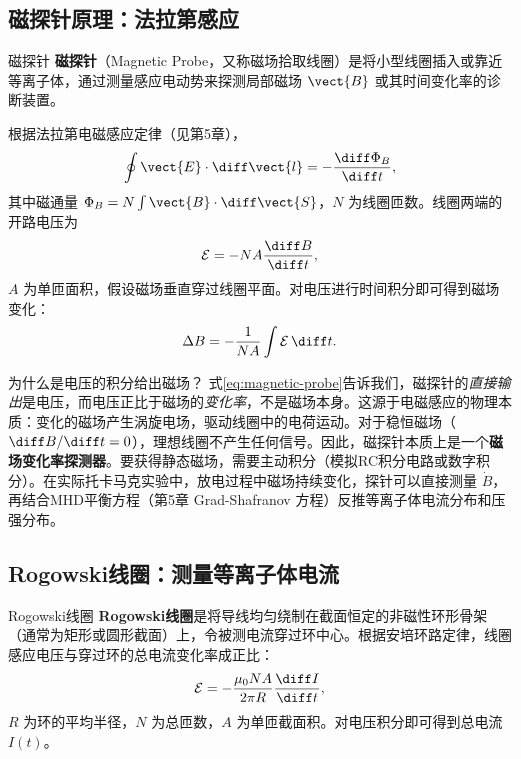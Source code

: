 \subsection{磁探针原理：法拉第感应}

\begin{definition}{磁探针}{}{}
\textbf{磁探针}（Magnetic Probe，又称磁场拾取线圈）是将小型线圈插入或靠近等离子体，通过测量感应电动势来探测局部磁场 $\vect{B}$ 或其时间变化率的诊断装置。
\end{definition}

根据法拉第电磁感应定律（见第5章），
\begin{equation}
\oint \vect{E}\cdot\diff\vect{l} = -\frac{\diff\Phi_B}{\diff t},
\label{eq:faraday}
\end{equation}
其中磁通量 $\Phi_B = N \int \vect{B}\cdot\diff\vect{S}$，$N$ 为线圈匝数。线圈两端的开路电压为
\begin{equation}
\mathcal{E} = -N A \frac{\diff B}{\diff t},
\label{eq:magnetic-probe}
\end{equation}
$A$ 为单匝面积，假设磁场垂直穿过线圈平面。对电压进行时间积分即可得到磁场变化：
\begin{equation}
\Delta B = -\frac{1}{NA}\int \mathcal{E}\,\diff t.
\label{eq:b-integration}
\end{equation}

\begin{insight}{为什么是电压的积分给出磁场？}{}{}
式\eqref{eq:magnetic-probe}告诉我们，磁探针的\emph{直接输出}是电压，而电压正比于磁场的\emph{变化率}，不是磁场本身。这源于电磁感应的物理本质：变化的磁场产生涡旋电场，驱动线圈中的电荷运动。对于稳恒磁场（$\diff B/\diff t = 0$），理想线圈不产生任何信号。因此，磁探针本质上是一个\textbf{磁场变化率探测器}。要获得静态磁场，需要主动积分（模拟RC积分电路或数字积分）。在实际托卡马克实验中，放电过程中磁场持续变化，探针可以直接测量 $\dot{B}$，再结合MHD平衡方程（第5章 Grad-Shafranov 方程）反推等离子体电流分布和压强分布。
\end{insight}

\subsection{Rogowski线圈：测量等离子体电流}

\begin{definition}{Rogowski线圈}{}{}
\textbf{Rogowski线圈}是将导线均匀绕制在截面恒定的非磁性环形骨架（通常为矩形或圆形截面）上，令被测电流穿过环中心。根据安培环路定律，线圈感应电压与穿过环的总电流变化率成正比：
\begin{equation}
\mathcal{E} = -\frac{\mu_0 N A}{2\pi R}\frac{\diff I}{\diff t},
\label{eq:rogowski}
\end{equation}
$R$ 为环的平均半径，$N$ 为总匝数，$A$ 为单匝截面积。对电压积分即可得到总电流 $I(t)$。
\end{definition}


